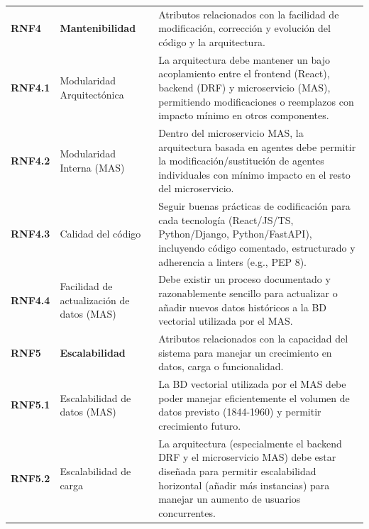 \begin{longtable}{@{}l >{\raggedright\arraybackslash}p{5cm} >{\raggedright\arraybackslash}p{8cm}@{}}
	\textbf{RNF4} & \textbf{Mantenibilidad} & Atributos relacionados con la facilidad de modificación, corrección y evolución del código y la arquitectura. \\
	\textbf{RNF4.1} & Modularidad Arquitectónica & La arquitectura debe mantener un bajo acoplamiento entre el frontend (React), backend (DRF) y microservicio (MAS), permitiendo modificaciones o reemplazos con impacto mínimo en otros componentes. \\
	\textbf{RNF4.2} & Modularidad Interna (MAS) & Dentro del microservicio MAS, la arquitectura basada en agentes debe permitir la modificación/sustitución de agentes individuales con mínimo impacto en el resto del microservicio. \\
	\textbf{RNF4.3} & Calidad del código & Seguir buenas prácticas de codificación para cada tecnología (React/JS/TS, Python/Django, Python/FastAPI), incluyendo código comentado, estructurado y adherencia a linters (e.g., PEP 8). \\
	\textbf{RNF4.4} & Facilidad de actualización de datos (MAS) & Debe existir un proceso documentado y razonablemente sencillo para actualizar o añadir nuevos datos históricos a la BD vectorial utilizada por el MAS. \\
	\midrule
	
	\textbf{RNF5} & \textbf{Escalabilidad} & Atributos relacionados con la capacidad del sistema para manejar un crecimiento en datos, carga o funcionalidad. \\
	\textbf{RNF5.1} & Escalabilidad de datos (MAS) & La BD vectorial utilizada por el MAS debe poder manejar eficientemente el volumen de datos previsto (1844-1960) y permitir crecimiento futuro. \\
	\textbf{RNF5.2} & Escalabilidad de carga & La arquitectura (especialmente el backend DRF y el microservicio MAS) debe estar diseñada para permitir escalabilidad horizontal (añadir más instancias) para manejar un aumento de usuarios concurrentes. \\
	\midrule
	

\end{longtable}
